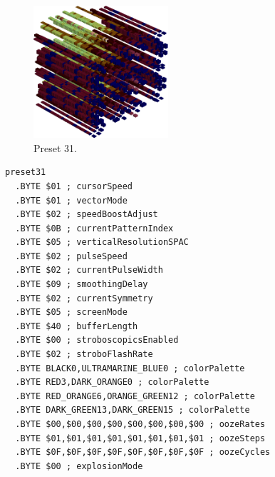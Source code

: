 \begin{minipage}[b]{0.48\linewidth}
\begin{figure}[H]                                                          
  \centering                                                             
  \begin{adjustbox}{width=5cm,center}                                   
  \includegraphics[width=5cm]{src/colorspace_presets/preset31-45.png}%
  \end{adjustbox}                                                        
\caption*{Preset 31.}                                           
\end{figure}                                                               
\end{minipage}
\hspace{0.1cm}
\begin{minipage}[b]{0.48\linewidth}                                       
\begin{lstlisting}[basicstyle=\ttfamily\tiny]
preset31
  .BYTE $01 ; cursorSpeed
  .BYTE $01 ; vectorMode
  .BYTE $02 ; speedBoostAdjust
  .BYTE $0B ; currentPatternIndex
  .BYTE $05 ; verticalResolutionSPAC
  .BYTE $02 ; pulseSpeed
  .BYTE $02 ; currentPulseWidth
  .BYTE $09 ; smoothingDelay
  .BYTE $02 ; currentSymmetry
  .BYTE $05 ; screenMode
  .BYTE $40 ; bufferLength
  .BYTE $00 ; stroboscopicsEnabled
  .BYTE $02 ; stroboFlashRate
  .BYTE BLACK0,ULTRAMARINE_BLUE0 ; colorPalette
  .BYTE RED3,DARK_ORANGE0 ; colorPalette
  .BYTE RED_ORANGE6,ORANGE_GREEN12 ; colorPalette
  .BYTE DARK_GREEN13,DARK_GREEN15 ; colorPalette
  .BYTE $00,$00,$00,$00,$00,$00,$00,$00 ; oozeRates
  .BYTE $01,$01,$01,$01,$01,$01,$01,$01 ; oozeSteps
  .BYTE $0F,$0F,$0F,$0F,$0F,$0F,$0F,$0F ; oozeCycles
  .BYTE $00 ; explosionMode
\end{lstlisting}
\end{minipage}

